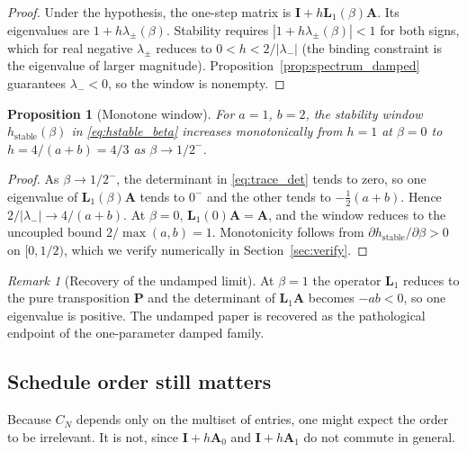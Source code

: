 \documentclass[12pt, a4paper]{article}
\theoremstyle{plain}
\newtheorem{proposition}{Proposition}
\theoremstyle{definition}
\theoremstyle{remark}
\newtheorem{remark}{Remark}
\newcommand{\bI}{\mathbf{I}}
\newcommand{\bP}{\mathbf{P}}
\newcommand{\bA}{\mathbf{A}}
\newcommand{\bL}{\mathbf{L}}
\begin{document}
\begin{proof}
Under the hypothesis, the one-step matrix is $\bI + h\bL_1(\beta)\bA$. Its
eigenvalues are $1 + h\lambda_\pm(\beta)$. Stability requires
$|1 + h\lambda_\pm(\beta)| < 1$ for both signs, which for real negative
$\lambda_\pm$ reduces to $0 < h < 2/|\lambda_-|$ (the binding constraint is
the eigenvalue of larger magnitude). Proposition~\ref{prop:spectrum_damped}
guarantees $\lambda_- < 0$, so the window is nonempty.
\end{proof}

\begin{proposition}[Monotone window]
\label{prop:monotone}
For $a=1$, $b=2$, the stability window $h_{\mathrm{stable}}(\beta)$ in
\eqref{eq:hstable_beta} increases monotonically from $h = 1$ at $\beta = 0$
to $h = 4/(a+b) = 4/3$ as $\beta \to 1/2^-$.
\end{proposition}

\begin{proof}
As $\beta \to 1/2^-$, the determinant in \eqref{eq:trace_det} tends to zero,
so one eigenvalue of $\bL_1(\beta)\bA$ tends to $0^-$ and the other tends to
$-\tfrac{1}{2}(a+b)$. Hence $2/|\lambda_-| \to 4/(a+b)$. At $\beta = 0$,
$\bL_1(0)\bA = \bA$, and the window reduces to the uncoupled bound
$2/\max(a,b) = 1$. Monotonicity follows from $\partial h_{\mathrm{stable}} /
\partial\beta > 0$ on $[0, 1/2)$, which we verify numerically in
Section~\ref{sec:verify}.
\end{proof}

\begin{remark}[Recovery of the undamped limit]
At $\beta = 1$ the operator $\bL_1$ reduces to the pure transposition $\bP$
and the determinant of $\bL_1\bA$ becomes $-ab < 0$, so one eigenvalue is
positive. The undamped paper is recovered as the pathological endpoint of
the one-parameter damped family.
\end{remark}

\subsection{Schedule order still matters}

Because $C_N$ depends only on the multiset of entries, one might expect the
order to be irrelevant. It is not, since $\bI+h\bA_0$ and $\bI+h\bA_1$ do not
commute in general.
\end{document}
